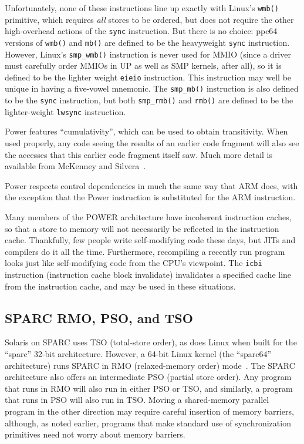 Unfortunately, none of these instructions line up exactly with Linux's
{\tt wmb()} primitive, which requires {\em all} stores to be ordered,
but does not require the other high-overhead actions of the {\tt sync}
instruction.
But there is no choice: ppc64 versions of {\tt wmb()} and {\tt mb()} are
defined to be the heavyweight {\tt sync} instruction.
However, Linux's {\tt smp\_wmb()} instruction is never used for MMIO
(since a driver must carefully order MMIOs in UP as well as
SMP kernels, after all), so it is defined to be the lighter weight
{\tt eieio} instruction.
This instruction may well be unique in having a five-vowel mnemonic.
The {\tt smp\_mb()} instruction is also defined to be the {\tt sync}
instruction, but both {\tt smp\_rmb()} and {\tt rmb()} are defined to
be the lighter-weight {\tt lwsync} instruction.

Power features ``cumulativity'', which can be used to obtain
transitivity.
When used properly, any code seeing the results of an earlier
code fragment will also see the accesses that this earlier code
fragment itself saw.
Much more detail is available from
McKenney and Silvera~\cite{PaulEMcKenneyN2745r2009}.

Power respects control dependencies in much the same way that ARM
does, with the exception that the Power  instruction
is substituted for the ARM  instruction.

Many members of the POWER architecture have incoherent instruction
caches, so that a store to memory will not necessarily be reflected
in the instruction cache.
Thankfully, few people write self-modifying code these days, but JITs
and compilers do it all the time.
Furthermore, recompiling a recently run program looks just like
self-modifying code from the CPU's viewpoint.
The {\tt icbi} instruction (instruction cache block invalidate)
invalidates a specified cache line from
the instruction cache, and may be used in these situations.

\subsection{SPARC RMO, PSO, and TSO}

Solaris on SPARC uses TSO (total-store order), as does Linux when built for
the ``sparc'' 32-bit architecture.
However, a 64-bit Linux kernel (the ``sparc64'' architecture)
runs SPARC in RMO (relaxed-memory order) mode~\cite{SPARC94}.
The SPARC architecture also offers an intermediate PSO (partial store
order).
Any program that runs in RMO will also run in either PSO or TSO, and similarly,
a program that runs in PSO will also run in TSO.
Moving a shared-memory parallel program in the other direction may
require careful insertion of memory barriers, although, as noted earlier,
programs that make standard use of synchronization primitives need not
worry about memory barriers.

